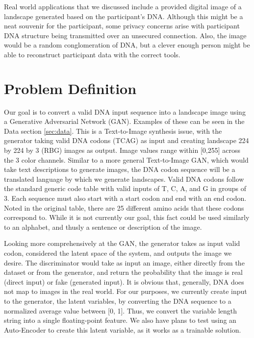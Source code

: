 \documentclass{article}
\begin{document}
	Real world applications that we discussed include a provided digital image of a landscape generated based on the participant’s DNA. Although this might be a neat souvenir for the participant, some privacy concerns arise with participant DNA structure being transmitted over an unsecured connection. Also, the image would be a random conglomeration of DNA, but a clever enough person might be able to reconstruct participant data with the correct tools. 
	
	
	\section{Problem Definition}
	\label{sec:problemdef}
	Our goal is to convert a valid DNA input sequence into a landscape image using a Generative Adversarial Network (GAN). Examples of these can be seen in the Data section \ref{sec:data}. This is a Text-to-Image synthesis issue, with the generator taking valid DNA codons (TCAG) as input and creating landscape 224 by 224 by 3 (RBG) images as output. Image values range within [0,255] across the 3 color channels. Similar to a more general Text-to-Image GAN, which would take text descriptions to generate images, the DNA codon sequence will be a translated language by which we generate landscapes. Valid DNA codons follow the standard generic code table with valid inputs of T, C, A, and G in groups of 3. Each sequence must also start with a start codon and end with an end codon. Noted in the original table, there are 25 different amino acids that these codons correspond to. While it is not currently our goal, this fact could be used similarly to an alphabet, and thusly a sentence or description of the image. 

	Looking more comprehensively at the GAN, the generator takes as input valid codon, considered the latent space of the system, and outputs the image we desire. The discriminator would take as input an image, either directly from the dataset or from the generator, and return the probability that the image is real (direct input) or fake (generated input). It is obvious that, generally, DNA does not map to images in the real world. For our purposes, we currently create input to the generator, the latent variables, by converting the DNA sequence to a normalized average value between [0, 1]. Thus, we convert the variable length string into a single floating-point feature. We also have plans to test using an Auto-Encoder to create this latent variable, as it works as a trainable solution. 
\end{document}
